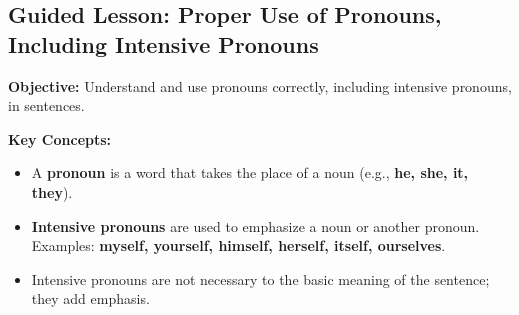 \documentclass[12pt]{article}
\title{}
\date{}
\begin{document}
\subsection*{Guided Lesson: Proper Use of Pronouns, Including Intensive Pronouns}
\onehalfspacing

\begin{tcolorbox}[colframe=black!40, colback=gray!5, 
coltitle=black, colbacktitle=black!20, fonttitle=\bfseries\Large, 
title=Learning Objective, halign title=center, left=5pt, right=5pt, top=5pt, bottom=15pt]
\textbf{Objective:} Understand and use pronouns correctly, including intensive pronouns, in sentences.
\end{tcolorbox}

\vspace{1em}

\begin{tcolorbox}[colframe=black!60, colback=white, 
coltitle=black, colbacktitle=black!15, fonttitle=\bfseries\Large, 
title=Key Concepts and Vocabulary, halign title=center, left=10pt, right=10pt, top=10pt, bottom=15pt]
\textbf{Key Concepts:}
\begin{itemize}
    \item A \textbf{pronoun} is a word that takes the place of a noun (e.g., \textbf{he, she, it, they}).
    \item \textbf{Intensive pronouns} are used to emphasize a noun or another pronoun. Examples: \textbf{myself, yourself, himself, herself, itself, ourselves}.
    \item Intensive pronouns are not necessary to the basic meaning of the sentence; they add emphasis.

\end{itemize}
\end{tcolorbox}

\vspace{1em}
\end{document}
